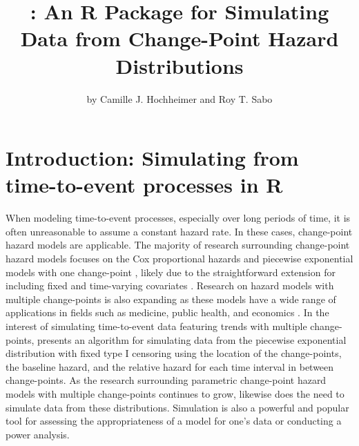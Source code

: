 

\title{: An R Package for Simulating Data from Change-Point Hazard Distributions}
\author{by Camille J. Hochheimer and Roy T. Sabo}

\maketitle


\section{Introduction: Simulating from time-to-event processes in R}

When modeling time-to-event processes, especially over long periods of time, it is often unreasonable to assume a constant hazard rate. In these cases, change-point hazard models are applicable. The majority of research surrounding change-point hazard models focuses on the Cox proportional hazards and piecewise exponential models with one change-point \citep{Yao, Gijbels, Wu, Rojas, Dupuy}, likely due to the straightforward extension for including fixed and time-varying covariates \citep{Zhou, Hendry, MontezGuidelines, Wong}. Research on hazard models with multiple change-points is also expanding as these models have a wide range of applications in fields such as medicine, public health, and economics \citep{Liu, Goodman, He, Han, Qian, Cai}. In the interest of simulating time-to-event data featuring trends with multiple change-points, \cite{Walke} presents an algorithm for simulating data from the piecewise exponential distribution with fixed type I censoring using the location of the change-points, the baseline hazard, and the relative hazard for each time interval in between change-points. As the research surrounding parametric change-point hazard models with multiple change-points continues to grow, likewise does the need to simulate data from these distributions. Simulation is also a powerful and popular tool for assessing the appropriateness of a model for one's data or conducting a power analysis.

